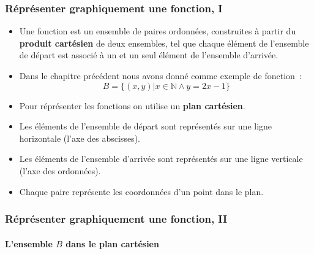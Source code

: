 \documentclass[10pt,notheorems]{beamer}
\theoremstyle{plain}
\theoremstyle{definition} %
\begin{document}
\begin{frame}
  \frametitle{Réprésenter graphiquement une fonction, I}
  \hypertarget{slide_plan_cartesien_1}{}

  \begin{itemize}

  \item Une fonction est un ensemble de paires ordonnées, construites
    à partir du \textbf{produit cartésien} de deux ensembles, tel que chaque
    élément de l'ensemble de départ est associé à un et un seul
    élément de l'ensemble d'arrivée.\newline

  \item Dans le chapitre précédent nous avons donné comme exemple de fonction~:
    \[
      B = \{(x,y) | x\in\mathbb N \land y = 2x-1\}
    \]

  \item Pour réprésenter les fonctions on utilise un \textbf{plan cartésien}.\newline

  \item Les éléments de l'ensemble de départ sont représentés sur une ligne horizontale (l'axe des abscisses).\newline

  \item Les éléments de l'ensemble d'arrivée sont représentés sur une ligne verticale (l'axe des ordonnées).\newline

  \item Chaque paire représente les coordonnées d'un point dans le plan.

  \end{itemize}

\end{frame}


\begin{frame}
  \frametitle{Réprésenter graphiquement une fonction, II}
  \framesubtitle{L'ensemble $B$ dans le plan cartésien}
  \hypertarget{slide_plan_cartesien_2}{}

  \begin{center}
  \end{center}

\end{frame}
\end{document}
